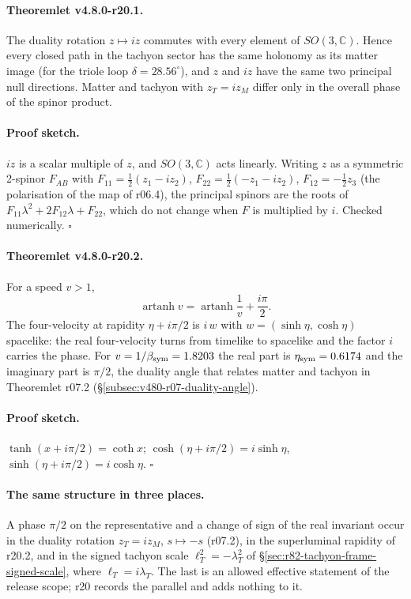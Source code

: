 \paragraph{Theoremlet v4.8.0-r20.1.}
The duality rotation \(z\mapsto iz\) commutes with every element of \(SO(3,\mathbb C)\).  Hence every closed path in
the tachyon sector has the same holonomy as its matter image (for the triole loop \(\delta=28.56^\circ\)), and \(z\) and
\(iz\) have the same two principal null directions.  Matter and tachyon with \(z_T=iz_M\) differ only in the overall
phase of the spinor product.

\paragraph{Proof sketch.}
\(iz\) is a scalar multiple of \(z\), and \(SO(3,\mathbb C)\) acts linearly.  Writing \(z\) as a symmetric 2-spinor
\(F_{AB}\) with \(F_{11}=\tfrac12(z_1-iz_2)\), \(F_{22}=\tfrac12(-z_1-iz_2)\), \(F_{12}=-\tfrac12z_3\) (the polarisation of the
map of r06.4), the principal spinors are the roots of \(F_{11}\lambda^2+2F_{12}\lambda+F_{22}\), which do not change when
\(F\) is multiplied by \(i\).  Checked numerically.  \(\square\)

\paragraph{Theoremlet v4.8.0-r20.2.}
For a speed \(v>1\),
\[
\operatorname{artanh}v=\operatorname{artanh}\frac1v+\frac{i\pi}{2}.
\]
The four-velocity at rapidity \(\eta+i\pi/2\) is \(i\,w\) with \(w=(\sinh\eta,\cosh\eta)\) spacelike: the real
four-velocity turns from timelike to spacelike and the factor \(i\) carries the phase.  For \(v=1/\beta_{\mathrm{sym}}=1.8203\) the real
part is \(\eta_{\rm sym}=0.6174\) and the imaginary part is \(\pi/2\), the duality angle that relates matter and tachyon
in Theoremlet r07.2 (\S\ref{subsec:v480-r07-duality-angle}).

\paragraph{Proof sketch.}
\(\tanh(x+i\pi/2)=\coth x\); \(\cosh(\eta+i\pi/2)=i\sinh\eta\), \(\sinh(\eta+i\pi/2)=i\cosh\eta\).  \(\square\)

\paragraph{The same structure in three places.}
A phase \(\pi/2\) on the representative and a change of sign of the real invariant occur in the duality rotation
\(z_T=iz_M\), \(s\mapsto-s\) (r07.2), in the superluminal rapidity of r20.2, and in the signed tachyon scale
\(\ell_T^2=-\lambda_T^2\) of \S\ref{sec:r82-tachyon-frame-signed-scale}, where \(\ell_T=i\lambda_T\).  The last is an
allowed effective statement of the release scope; r20 records the parallel and adds nothing to it.

